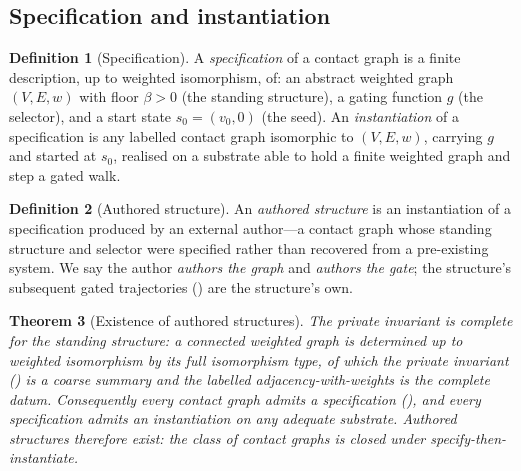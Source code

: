 \documentclass[11pt,a4paper]{article}
\theoremstyle{thmstyle}
\newtheorem{theorem}{Theorem}[section]
\theoremstyle{definition}
\newtheorem{definition}[theorem]{Definition}
\theoremstyle{remark}
\newcommand{\V}{V}                        %
\newcommand{\E}{E}                        %
\newcommand{\wt}{w}                       %
\newcommand{\floorc}{\beta}               %
\newcommand{\gate}{g}                     %
\begin{document}
\subsection{Specification and instantiation}

\begin{definition}[Specification]
\label{def:spec}
A \emph{specification} of a contact graph is a finite description, up to weighted
isomorphism, of: an abstract weighted graph $(\V,\E,\wt)$ with floor $\floorc>0$
(the standing structure), a gating function $\gate$ (the selector), and a start
state $s_0=(v_0,0)$ (the seed). An \emph{instantiation} of a specification is any
labelled contact graph isomorphic to $(\V,\E,\wt)$, carrying $\gate$ and started
at $s_0$, realised on a substrate able to hold a finite weighted graph and step a
gated walk.
\end{definition}

\begin{definition}[Authored structure]
\label{def:authored}
An \emph{authored structure} is an instantiation of a specification produced by
an external author---a contact graph whose standing structure and selector were
specified rather than recovered from a pre-existing system. We say the author
\emph{authors the graph} and \emph{authors the gate}; the structure's subsequent
gated trajectories \textup{(}\textup{)} are the structure's
own.
\end{definition}

\begin{theorem}[Existence of authored structures]
\label{thm:authored-exist}
The private invariant is complete for the standing structure: a connected
weighted graph is determined up to weighted isomorphism by its full isomorphism
type, of which the private invariant \textup{(}\textup{)} is a
coarse summary and the labelled adjacency-with-weights is the complete datum.
Consequently every contact graph admits a specification
\textup{(}\textup{)}, and every specification admits an
instantiation on any adequate substrate. Authored structures therefore exist:
the class of contact graphs is closed under specify-then-instantiate.
\end{theorem}
\end{document}
